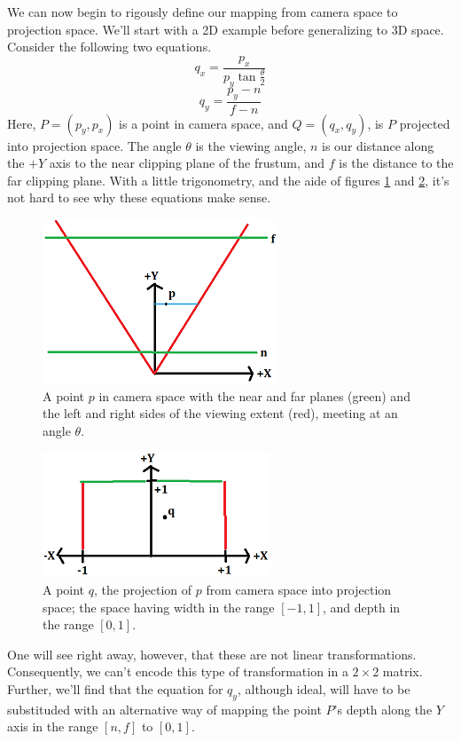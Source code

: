 \documentclass[12pt]{article}
\begin{document}
We can now begin to rigously define our mapping from camera space to projection space.  We'll start with a 2D example before generalizing to 3D space.  Consider the following two equations.
\begin{equation*}
q_x = \frac{p_x}{p_y\tan\frac{\theta}{2}}
\end{equation*}
\begin{equation*}
q_y = \frac{p_y-n}{f-n}
\end{equation*}
Here, $P=(p_y,p_x)$ is a point in camera space, and $Q=(q_x,q_y)$, is $P$ projected into projection space.
The angle $\theta$ is the viewing angle, $n$ is our distance along the $+Y$ axis to the near clipping plane of the frustum, and $f$ is the distance to the far clipping plane.  With a little trigonometry, and the aide of figures \ref{fig1} and \ref{fig2}, it's not hard to see why these equations make sense.
\begin{figure}
\centering
\includegraphics{fig1}
\caption{A point $p$ in camera space with the near and far planes (green) and the left and right sides of the viewing extent (red), meeting at an angle $\theta$.}
\label{fig1}
\end{figure}
\begin{figure}
\centering
\includegraphics{fig2}
\caption{A point $q$, the projection of $p$ from camera space into projection space; the space having width in the range $[-1,1]$, and depth in the range $[0,1]$.}
\label{fig2}
\end{figure}
One will see right away, however, that these are not linear transformations.  Consequently, we can't encode this type of transformation in a $2\times 2$ matrix.  Further, we'll find that the equation for $q_y$, although ideal, will have to be substituded with an alternative way of mapping the point $P$'s depth along the $Y$ axis in the range $[n,f]$ to $[0,1]$.
\end{document}
